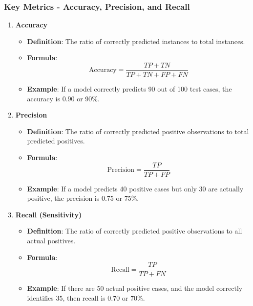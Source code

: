 \documentclass[aspectratio=169]{beamer}
\begin{document}
\begin{frame}[fragile]
    \frametitle{Key Metrics - Accuracy, Precision, and Recall}
    
    \begin{enumerate}
        \item \textbf{Accuracy}
        \begin{itemize}
            \item \textbf{Definition}: The ratio of correctly predicted instances to total instances.
            \item \textbf{Formula}: 
            \[
            \text{Accuracy} = \frac{TP + TN}{TP + TN + FP + FN}
            \]
            \item \textbf{Example}: If a model correctly predicts 90 out of 100 test cases, the accuracy is \( 0.90 \) or 90\%.
        \end{itemize}
        
        \item \textbf{Precision}
        \begin{itemize}
            \item \textbf{Definition}: The ratio of correctly predicted positive observations to total predicted positives.
            \item \textbf{Formula}: 
            \[
            \text{Precision} = \frac{TP}{TP + FP}
            \]
            \item \textbf{Example}: If a model predicts 40 positive cases but only 30 are actually positive, the precision is \( 0.75 \) or 75\%.
        \end{itemize}
        
        \item \textbf{Recall (Sensitivity)}
        \begin{itemize}
            \item \textbf{Definition}: The ratio of correctly predicted positive observations to all actual positives.
            \item \textbf{Formula}: 
            \[
            \text{Recall} = \frac{TP}{TP + FN}
            \]
            \item \textbf{Example}: If there are 50 actual positive cases, and the model correctly identifies 35, then recall is \( 0.70 \) or 70\%.
        \end{itemize}
    \end{enumerate}
\end{frame}
\end{document}

